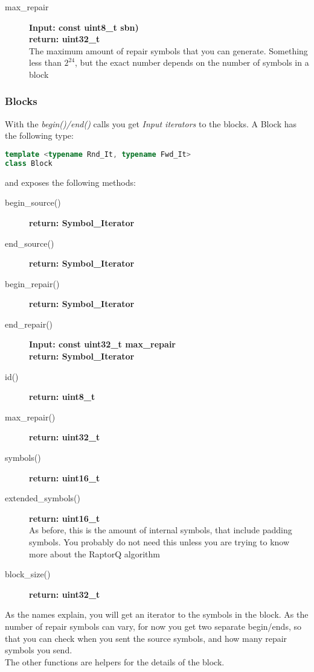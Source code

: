 \documentclass[11pt,a4paper]{refart}
\begin{document}
\begin{description}
\item[max\_repair] \textbf{Input: const uint8\_t sbn)}\\
\textbf{return: uint32\_t}\\
The maximum amount of repair symbols that you can generate. Something less than $2^{24}$, but the exact number depends on the number of symbols
in a block
\end{description}

\subsubsection{Blocks}
With the \textit{begin()/end()} calls you get \textit{Input iterators} to the blocks. A Block has the following type:
\begin{lstlisting}[language=C++]
template <typename Rnd_It, typename Fwd_It>
class Block
\end{lstlisting}
and exposes the	 following methods:
\begin{description}
\item[begin\_source()]\textbf{return: Symbol\_Iterator}
\item[end\_source()]\textbf{return: Symbol\_Iterator}
\item[begin\_repair()]\textbf{return: Symbol\_Iterator}
\item[end\_repair()]\textbf{Input: const uint32\_t max\_repair}\\
\textbf{return: Symbol\_Iterator}
\item[id()]\textbf{return: uint8\_t}
\item[max\_repair()]\textbf{return: uint32\_t}
\item[symbols()]\textbf{return: uint16\_t}
\item[extended\_symbols()]\textbf{return: uint16\_t}\\
As before, this is the amount of internal symbols, that include padding symbols. You probably do not need this unless you are trying
to know more about the RaptorQ algorithm

\item[block\_size()]\textbf{return: uint32\_t}
\end{description}

As the names explain, you will get an iterator to the symbols in the block. As the number of repair symbols can vary, for now you get two separate begin/ends,
so that you can check when you sent the source symbols, and how many repair symbols you send.\\
The other functions are helpers for the details of the block.
\end{document}
